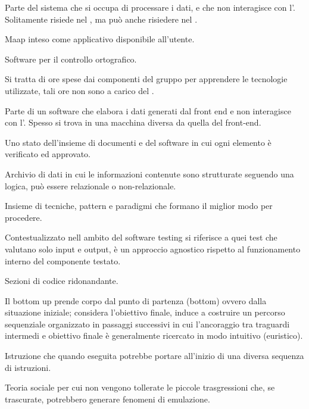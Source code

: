 Parte del sistema che si occupa di processare i dati, e che non interagisce con l'. Solitamente risiede nel , ma può anche risiedere nel .

Maap inteso come applicativo disponibile all'utente.

Software  per il controllo ortografico.

Si tratta di ore spese dai componenti del gruppo per apprendere le tecnologie utilizzate, tali ore non sono a carico del .


Parte di un software che elabora i dati generati dal front end e non interagisce con l'. Spesso si trova in una macchina diversa da quella del front-end.

Uno stato dell'insieme di documenti e del software in cui ogni elemento è verificato ed approvato.

Archivio di dati in cui le informazioni contenute sono strutturate seguendo una logica, può essere relazionale o non-relazionale.

Insieme di tecniche, pattern e paradigmi che formano il miglior modo per procedere.

Contestualizzato nell ambito del software testing si riferisce a quei test che valutano solo input e output, è un approccio agnostico rispetto al funzionamento interno del componente testato.

Sezioni di codice ridonandante.

Il bottom up prende corpo dal punto di partenza (bottom) ovvero dalla situazione iniziale; considera l'obiettivo finale, induce a costruire un percorso sequenziale organizzato in passaggi successivi in cui l'ancoraggio tra traguardi intermedi e obiettivo finale è generalmente ricercato in modo intuitivo (euristico).

Istruzione che quando eseguita potrebbe portare all'inizio di una diversa sequenza di istruzioni.

Teoria sociale per cui non vengono tollerate le piccole trasgressioni che, se trascurate, potrebbero generare fenomeni di emulazione. 

